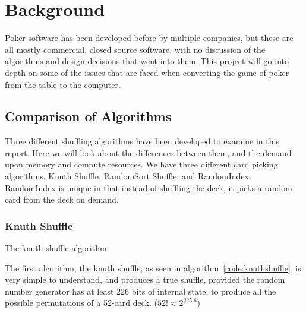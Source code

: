 \section{Background}
Poker software has been developed before by multiple companies, but these
are all mostly commercial, closed source software, with no discussion of the
algorithms and design decisions that went into them. This project will go
into depth on some of the issues that are faced when converting the game of
poker from the table to the computer.

\subsection{Comparison of Algorithms}

Three different shuffling algorithms have been developed to examine in this
report. Here we will look about the differences between them, and the demand
upon memory and compute resources. We have three different card picking
algorithms, Knuth Shuffle, RandomSort Shuffle, and RandomIndex. RandomIndex
is unique in that instead of shuffling the deck, it picks a random card
from the deck on demand.

\subsubsection{Knuth Shuffle}

\vspace{0.3cm}

\begin{algorithm}[H]
    \BlankLine{}
     
\caption{The knuth shuffle algorithm}
\label{code:knuthshuffle}
\end{algorithm}

\vspace{0.3cm}

The first algorithm, the knuth shuffle, as seen in algorithm~\ref{code:knuthshuffle},
is very simple to understand, and produces a true shuffle, provided the
random number generator has at least 226 bits of internal state, to produce all
the possible permutations of a 52-card deck. ($52! \approx 2^{225.6}$) \parencite{arkin1999}

